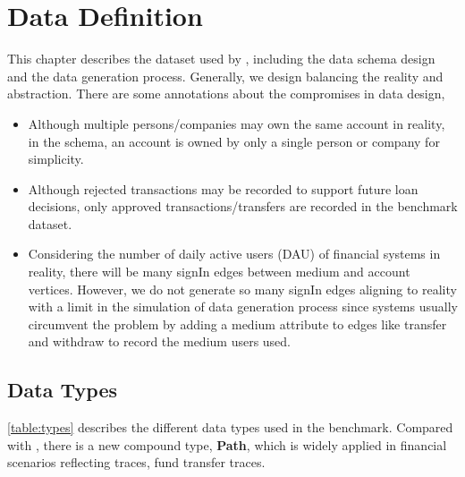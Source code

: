 \chapter{Data Definition}
\label{sec:data-definition}

This chapter describes the dataset used by \ldbcfinbench, including the data
schema design and the data generation process. Generally, we design
\ldbcfinbench balancing the reality and abstraction. There are some annotations
about the compromises in data design,
\begin{itemize}
    \item Although multiple persons/companies may own the same account in
          reality, in the schema, an account is owned by only a single person
          or company for simplicity.
    \item Although rejected transactions may be recorded to support future loan
          decisions, only approved transactions/transfers are recorded in the
          benchmark dataset.
    \item Considering the number of daily active users (DAU) of financial systems
          in reality, there will be
          many signIn edges between medium and account vertices. However, we do
          not generate so many signIn edges aligning to reality with a limit
          in the simulation of data generation process since systems usually
          circumvent the problem by adding a medium attribute to edges like
          transfer and withdraw to record the medium users used.
\end{itemize}

\section{Data Types}

\autoref{table:types} describes the different data types used in the benchmark.
Compared with \ldbcsnb, there is a new compound type, \textbf{Path}, which is
widely applied in financial scenarios reflecting traces, \eg fund transfer
traces. 

